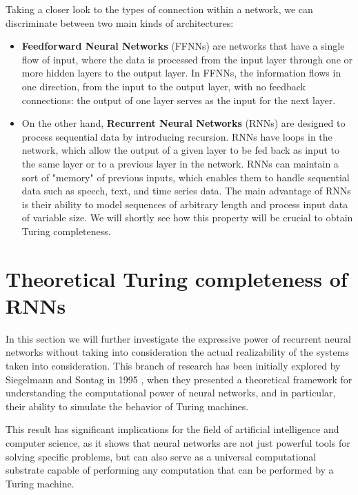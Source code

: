 \documentclass{article}
\begin{document}
Taking a closer look to the types of connection within a network, we can discriminate between two main kinds of architectures:

\begin{itemize}
    \item \textbf{Feedforward Neural Networks} (FFNNs) are networks that have a single flow of input, where the data is processed from the input layer through one or more hidden layers to the output layer. In FFNNs, the information flows in one direction, from the input to the output layer, with no feedback connections: the output of one layer serves as the input for the next layer.

    \item On the other hand, \textbf{Recurrent Neural Networks} (RNNs) are designed to process sequential data by introducing recursion. RNNs have loops in the network, which allow the output of a given layer to be fed back as input to the same layer or to a previous layer in the network. RNNs can maintain a sort of "memory" of previous inputs, which enables them to handle sequential data such as speech, text, and time series data. The main advantage of RNNs is their ability to model sequences of arbitrary length and process input data of variable size. We will shortly see how this property will be crucial to obtain Turing completeness.
\end{itemize}

\section{Theoretical Turing completeness of RNNs}\label{sec:theoretical}

In this section we will further investigate the expressive power of recurrent neural networks without taking into consideration the actual realizability of the systems taken into consideration. This branch of research has been initially explored by Siegelmann and Sontag in 1995 \cite{SIE95}, when they presented a theoretical framework for understanding the computational power of neural networks, and in particular, their ability to simulate the behavior of Turing machines.

This result has significant implications for the field of artificial intelligence and computer science, as it shows that neural networks are not just powerful tools for solving specific problems, but can also serve as a universal computational substrate capable of performing any computation that can be performed by a Turing machine.
\end{document}
